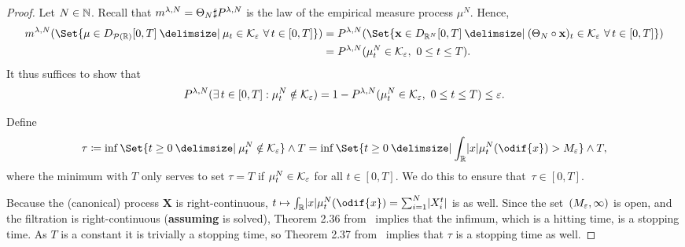 \begin{proof}
  Let \( N \in \mathbb{N} \).
  Recall that \(m^{\lambda, N} = \Theta_N \sharp P^{\lambda, N}\) is the law of the empirical measure process \(\mu^N\).
  Hence,
  \begin{equation}
    \begin{split}
      \lawmu^{\lambda, N} ( \Set{ \mu \in D_{\cP(\potspace)}[0,T] \given \mu_t \in \cK_\eps\ \forall t \in [0,T] } )
       & = P^{\lambda, N}( \Set{ \bm{x} \in D_{\potspace^N}[0,T] \given (\Theta_N \circ \bm{x})_t \in \cK_\eps\ \forall t \in [0,T] } ) \\
       & = P^{\lambda, N} (\mu_t^N \in \cK_\eps,\ 0 \leq t \leq T).
    \end{split}
  \end{equation}
  It thus suffices to show that
  \begin{equation}
    P^{\lambda, N} (\exists t \in [0,T] : \mu_t^N \notin \cK_\eps) = 1 - P^{\lambda, N} (\mu_t^N \in \cK_\eps,\ 0 \leq t \leq T) \leq \eps.
  \end{equation}

  \medskip

  Define
  \begin{equation}
    \tau \coloneqq  \inf\Set{ t \geq 0 \given \mu_t^N \notin \cK_\eps } \land T
    = \inf\Set{ t \geq 0 \given \int_\potspace \abs{x} \mu_t^N(\odif{x}) > M_\eps } \land T,
  \end{equation}
  where the minimum with \( T \) only serves to set \( \tau = T \) if \( \mu_t^N \in \mathcal{K}_\varepsilon \) for all \( t \in [0, T] \).
  We do this to ensure that~\( \tau \in [0,T] \).

  Because the (canonical) process \( \bm{X} \) is right-continuous, \( t \mapsto \int_\potspace \abs{x} \mu_t^N(\odif{x}) = \sum_{i=1}^N \abs{X_i^t} \) is as well.
  Since the set~\( (M_\varepsilon, \infty) \) is open, and the filtration is right-continuous (\textbf{assuming}  is solved), Theorem 2.36 from~\cite{klebanerIntroductionStochasticCalculus2012} implies that the infimum, which is a hitting time, is a stopping time.
  As \( T \) is a constant it is trivially a stopping time, so Theorem 2.37 from~\cite{klebanerIntroductionStochasticCalculus2012} implies that \( \tau \) is a stopping time as well.


\end{proof}
